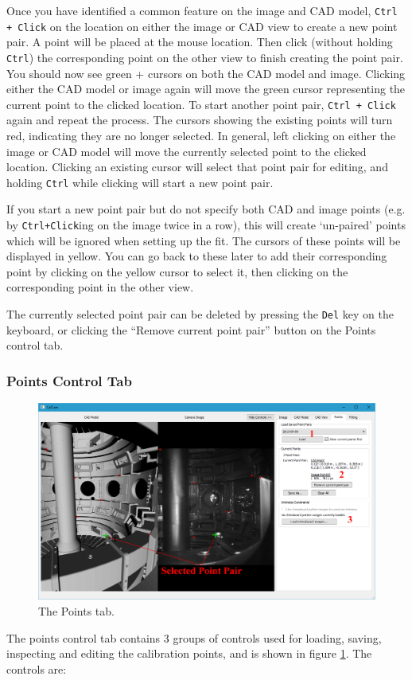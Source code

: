 \documentclass[12pt]{article}
\newcommand{\code}[1]{\texttt{#1}}
\begin{document}
Once you have identified a common feature on the image and CAD model, \code{Ctrl + Click}  on the location on either the image or CAD view to create a new point pair. A point will be placed at the mouse location. Then click (without holding \code{Ctrl}) the corresponding point on the other view to finish creating the point pair. You should now see green {\color{green} +} cursors on both the CAD model and image. Clicking either the CAD model or image again will move the green cursor representing the current point to the clicked location. To start another point pair, \code{Ctrl + Click} again and repeat the process. The cursors showing the existing points will turn red, indicating they are no longer selected. In general, left clicking on either the image or CAD model will move the currently selected point to the clicked location. Clicking an existing cursor will select that point pair for editing, and holding \code{Ctrl} while clicking will start a new point pair.

If you start a new point pair but do not specify both CAD and image points (e.g. by \code{Ctrl+Click}ing on the image twice in a row), this will create `un-paired' points which will be ignored when setting up the fit. The cursors of these points will be displayed in yellow. You can go back to these later to add their corresponding point by clicking on the yellow cursor to select it, then clicking on the corresponding point in the other view. 

The currently selected point pair can be deleted by pressing the \code{Del} key on the keyboard, or clicking the ``Remove current point pair'' button on the Points control tab.

\subsubsection{Points Control Tab}

\begin{figure}[ht]
\includegraphics[width=\textwidth]{points_tab.PNG}
\caption{\label{fig:points_tab}The Points tab.}
\end{figure}
The points control tab contains 3 groups of controls used for loading, saving, inspecting and editing the calibration points, and is shown in figure \ref{fig:points_tab}. The controls are:
\end{document}
